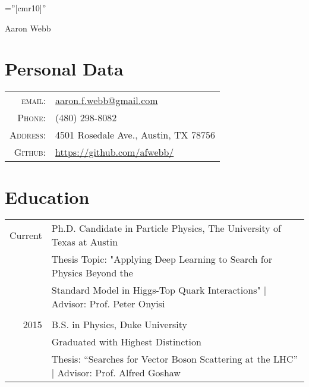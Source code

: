 \documentclass[a4paper,10pt]{article}
\begin{document}
\pagestyle{empty} %

\font\fb=''[cmr10]'' %


\par{\centering
		{\Huge Aaron Webb
	}\bigskip\par}


\section{Personal Data}
\begin{tabular}{rl}
    \textsc{email:}     & \href{mailto:aaron.f.webb@gmail.com}{aaron.f.webb@gmail.com} \\
    \textsc{Phone:}     & (480) 298-8082\\
    \textsc{Address:}   & 4501 Rosedale Ave., Austin, TX 78756 \\
    \textsc{Github:}    & \href{https://github.com/afwebb/}{https://github.com/afwebb/}
\end{tabular}


\section{Education}
\begin{tabular}{rl}

    Current & Ph.D. Candidate in Particle Physics, The University of Texas at Austin\\
    & Thesis Topic: "Applying Deep Learning to Search for Physics Beyond the \\ 
    & Standard Model in Higgs-Top Quark Interactions" | \small Advisor: Prof. Peter Onyisi \\\\
    
    2015 & B.S. in Physics, Duke University \\
    & Graduated with Highest Distinction \\
    & Thesis: ``Searches for Vector Boson Scattering at the LHC'' | \small Advisor: Prof. Alfred Goshaw\\

\end{tabular}
\end{document}
